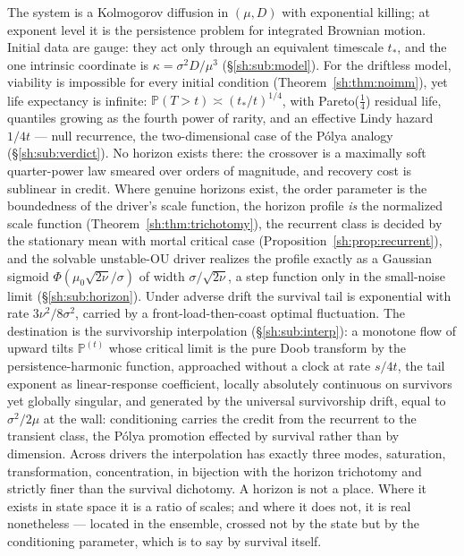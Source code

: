 \documentclass[11pt]{article}
\numberwithin{equation}{section}
\theoremstyle{plain}
\theoremstyle{definition}
\theoremstyle{remark}
\newcommand{\PP}{\mathbb{P}}
\begin{document}
The system is a Kolmogorov diffusion in $(\mu,D)$ with exponential
killing; at exponent level it is the persistence problem for integrated
Brownian motion. Initial data are gauge: they act only through an
equivalent timescale $t_*$, and the one intrinsic coordinate is
$\kappa=\sigma^2D/\mu^3$ (\S\ref{sh:sub:model}). For the driftless model,
viability is impossible for every initial condition
(Theorem~\ref{sh:thm:noimm}), yet life expectancy is infinite:
$\PP(T>t)\asymp(t_*/t)^{1/4}$, with Pareto($\tfrac14$) residual life,
quantiles growing as the fourth power of rarity, and an effective Lindy
hazard $1/4t$ --- null recurrence, the two-dimensional case of the P\'olya
analogy (\S\ref{sh:sub:verdict}). No horizon exists there: the crossover
is a maximally soft quarter-power law smeared over orders of magnitude,
and recovery cost is sublinear in credit. Where genuine horizons exist,
the order parameter is the boundedness of the driver's scale function,
the horizon profile \emph{is} the normalized scale function
(Theorem~\ref{sh:thm:trichotomy}), the recurrent class is decided by the
stationary mean with mortal critical case
(Proposition~\ref{sh:prop:recurrent}), and the solvable unstable-OU
driver realizes the profile exactly as a Gaussian sigmoid
$\Phi(\mu_0\sqrt{2\nu}/\sigma)$ of width $\sigma/\sqrt{2\nu}$, a step
function only in the small-noise limit (\S\ref{sh:sub:horizon}). Under
adverse drift the survival tail is exponential with rate
$3\nu^2/8\sigma^2$, carried by a front-load-then-coast optimal
fluctuation. The destination is the survivorship interpolation
(\S\ref{sh:sub:interp}): a monotone flow of upward tilts $\PP^{(t)}$
whose critical limit is the pure Doob transform by the
persistence-harmonic function, approached without a clock at rate
$s/4t$, the tail exponent as linear-response coefficient, locally
absolutely continuous on survivors yet globally singular, and generated
by the universal survivorship drift, equal to $\sigma^2/2\mu$ at the
wall: conditioning carries the credit from the recurrent to the transient
class, the P\'olya promotion effected by survival rather than by
dimension. Across
drivers the interpolation has exactly three modes, saturation,
transformation, concentration, in bijection with the horizon
trichotomy and strictly finer than the survival dichotomy. A horizon is
not a place. Where it exists in state space it is a ratio of scales; and
where it does not, it is real nonetheless --- located in the ensemble,
crossed not by the state but by the conditioning parameter, which is to
say by survival itself.
\end{document}
